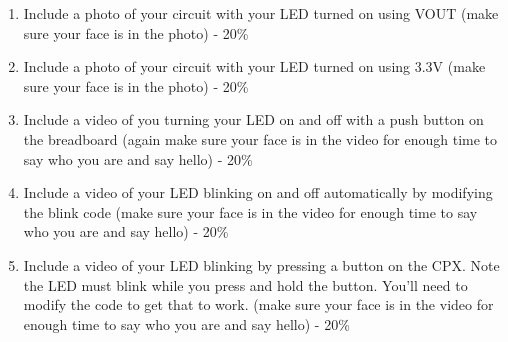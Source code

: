 

\begin{enumerate}[itemsep=-5pt]
\item Include a photo of your circuit with your LED turned on using VOUT (make sure your face is in the photo) - 20\%
\item Include a photo of your circuit with your LED turned on using 3.3V (make sure your face is in the photo) - 20\%
\item Include a video of you turning your LED on and off with a push button on the breadboard (again make sure your face is in the video for enough time to say who you are and say hello) - 20\%
\item Include a video of your LED blinking on and off automatically by modifying the blink code (make sure your face is in the video for enough time to say who you are and say hello) - 20\%
\item Include a video of your LED blinking by pressing a button on the CPX. Note the LED must blink while you press and hold the button. You'll need to modify the code to get that to work. (make sure your face is in the video for enough time to say who you are and say hello) - 20\%
\end{enumerate}

